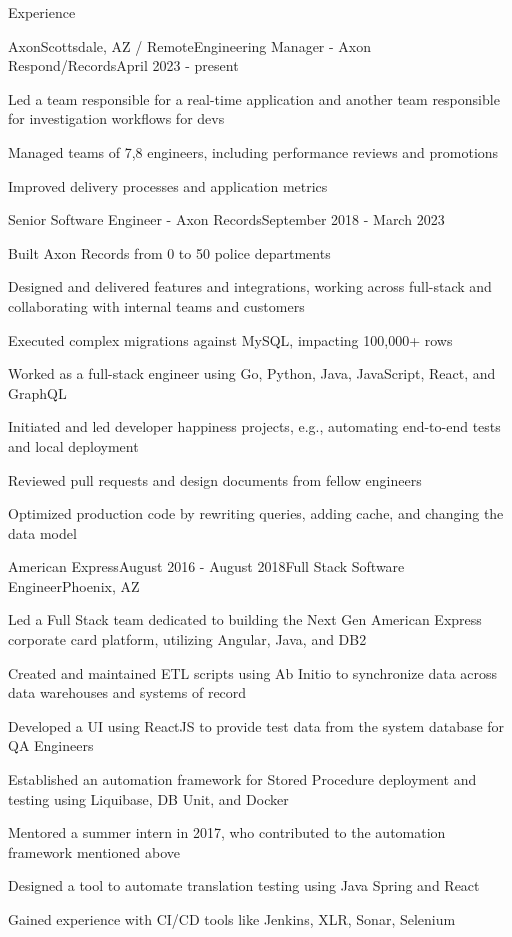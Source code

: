 \documentclass{resume} %
\begin{document}
\begin{rSection}{Experience}

\begin{rSubsection}{Axon}{Scottsdale, AZ / Remote}{Engineering Manager - Axon Respond/Records}{April 2023 - present}
\item Led a team responsible for a real-time application and another team responsible for investigation workflows for devs
\item Managed teams of 7,8 engineers, including performance reviews and promotions
\item Improved delivery processes and application metrics
\end{rSubsection}

\begin{rSmallSubsection}{Senior Software Engineer - Axon Records}{September 2018 - March 2023}
\item Built Axon Records from 0 to 50 police departments
\item Designed and delivered features and integrations, working across full-stack and collaborating with internal teams and customers
\item Executed complex migrations against MySQL, impacting 100,000+ rows
\item Worked as a full-stack engineer using Go, Python, Java, JavaScript, React, and GraphQL
\item Initiated and led developer happiness projects, e.g., automating end-to-end tests and local deployment
\item Reviewed pull requests and design documents from fellow engineers
\item Optimized production code by rewriting queries, adding cache, and changing the data model
\end{rSmallSubsection}

\begin{rSubsection}{American Express}{August 2016 - August 2018}{Full Stack Software Engineer}{Phoenix, AZ}
\item Led a Full Stack team dedicated to building the Next Gen American Express corporate card platform, utilizing Angular, Java, and DB2
\item Created and maintained ETL scripts using Ab Initio to synchronize data across data warehouses and systems of record
\item Developed a UI using ReactJS to provide test data from the system database for QA Engineers
\item Established an automation framework for Stored Procedure deployment and testing using Liquibase, DB Unit, and Docker
\item Mentored a summer intern in 2017, who contributed to the automation framework mentioned above
\item Designed a tool to automate translation testing using Java Spring and React
\item Gained experience with CI/CD tools like Jenkins, XLR, Sonar, Selenium
\end{rSubsection}


\end{rSection}
\end{document}
